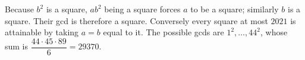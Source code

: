 Because $b^2$ is a square, $ab^2$ being a square forces $a$ to be a square; similarly $b$ is a square. Their gcd is therefore a square. Conversely every square at most $2021$ is attainable by taking $a=b$ equal to it. The possible gcds are $1^2,\ldots,44^2$, whose sum is $\dfrac{44\cdot45\cdot89}{6}=\boxed{29370}$.
